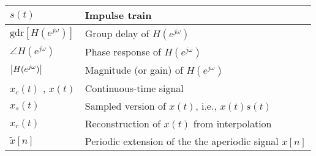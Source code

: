 \documentclass{article}
\begin{document}
\begin{xltabular}{\textwidth}{XX}
	\(s(t)\)                                                                                        & Impulse train                                                                                                                                                                                               \\ \hline
	\(\textrm{gdr}\left[ H (e^{j\omega}) \right]\) \cite{oppenheimDiscreteTimeSignalProcessing2009} & Group delay of \(H (e^{j\omega})\)                                                                                                                                                                          \\ \hline
	\(\angle H (e^{j\omega})\) \cite{oppenheimDiscreteTimeSignalProcessing2009}                     & Phase response of \(H (e^{j\omega})\)                                                                                                                                                                       \\ \hline
	\(\abs{H (e^{j\omega})}\) \cite{oppenheimDiscreteTimeSignalProcessing2009}                      & Magnitude (or gain) of \(H (e^{j\omega})\)                                                                                                                                                                  \\ \hline
	\(x_c(t)\) \cite{oppenheimDiscreteTimeSignalProcessing2009}, \(x(t)\)                           & Continuous-time signal                                                                                                                                                                                      \\ \hline
	\(x_s(t)\)                                                                                      & Sampled version of \(x(t)\), i.e., \(x(t)s(t)\)                                                                                                                                                             \\ \hline
	\(x_r(t)\)                                                                                      & Reconstruction of \(x(t)\) from interpolation                                                                                                                                                               \\ \hline
	\(\tilde{x}[n]\)                                                                                & Periodic extension of the the aperiodic signal \(x[n]\)                                                                                                                                                     \\ \hline
\end{xltabular}
\end{document}

